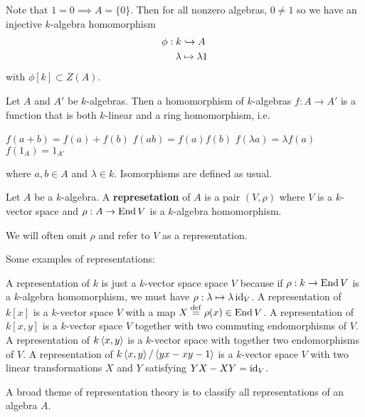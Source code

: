 \begin{rmk}
	Note that $1=0 \implies A=\{0\}$.
	Then for all nonzero algebras, $0 \neq 1$ so we have an injective $k$-algebra homomorphism
	\begin{align*}
		\phi:k&\hookrightarrow A \\
		\lambda&\mapsto\lambda 1
	\end{align*}
	with $\phi[k] \subset Z(A)$.	
\end{rmk}

\begin{defn}
	Let $A$ and $A'$ be $k$-algebras.
	Then a homomorphism of $k$-algebras $f:A \to A'$ is a function that is both $k$-linear and a ring homomorphism, i.e.\@
	\begin{itm}
		\io $f(a+b)=f(a)+f(b)$
		\io $f(ab)=f(a)f(b)$
		\io $f(\lambda a)=\lambda f(a)$
		\io $f(1_A)=1_{A'}$
	\end{itm}
	where $a,b \in A$ and $\lambda \in k$.
	Isomorphisms are defined as usual.
\end{defn}

\begin{defn}
	Let $A$ be a $k$-algebra.
	A \textbf{represetation} of $A$ is a pair $(V,\rho)$ where $V$ is a $k$-vector space and $\rho:A \to \operatorname{End} V$ is a $k$-algebra homomorphism.
\end{defn}

\begin{rmk}
	We will often omit $\rho$ and refer to $V$ as a representation.
\end{rmk}

\begin{exam}
	Some examples of representations:
	\begin{enum}
		\io A representation of $k$ is just a $k$-vector space space $V$ because if $\rho:k\to \operatorname{End} V$ is a $k$-algebra homomorphism, we must have $\rho:\lambda\mapsto \lambda\operatorname{id}_V$.
		\io A representation of $k[x]$ is a $k$-vector space $V$ with a map $X\overset{\mathrm{def}}{=}\rho(x)\in\operatorname{End} V$.
		\io A representation of $k[x,y]$ is a $k$-vector space $V$ together with two commuting endomorphisms of $V$.
		\io A representation of $k\left\langle x,y \right\rangle$ is a $k$-vector space with together two endomorphisms of $V$.
		\io A representation of $k\left\langle x,y \right\rangle/\left\langle yx-xy-1 \right\rangle$ is a $k$-vector space $V$ with two linear transformations $X$ and $Y$ satisfying $YX-XY=\operatorname{id}_V$.
	\end{enum}
\end{exam}

A broad theme of representation theory is to classify all representations of an algebra $A$.